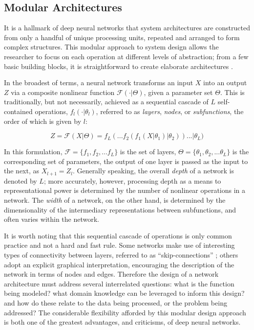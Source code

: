 \subsection{Modular Architectures}
\label{subsec:architectures}

It is a hallmark of deep neural networks that system architectures are constructed from only a handful of unique processing units, repeated and arranged to form complex structures.
This modular approach to system design allows the researcher to focus on each operation at different levels of abstraction;
from a few basic building blocks, it is straightforward to create elaborate architectures \cite{inceptionnet}.

In the broadest of terms, a neural network transforms an input $X$ into an output $Z$ via a composite nonlinear function $\mathcal{F}(\cdot \vert \Theta)$, given a parameter set $\Theta$.
This is traditionally, but not necessarily, achieved as a sequential cascade of $L$ self-contained operations, $f_l(\cdot \vert \theta_l)$, referred to as \emph{layers}, \emph{nodes}, or \emph{subfunctions}, the order of which is given by $l$:

\begin{equation}
\label{eq:layers}
Z = \mathcal{F}(X \vert \Theta) = f_{L}(  ... f_2(f_1(X \vert \theta_1) \vert \theta_2) ) ... \vert \theta_{L})
\end{equation}

\noindent In this formulation, $\mathcal{F} = \{f_1, f_2, ... f_{L} \}$ is the set of layers, $\Theta = \{\theta_1, \theta_2, ... \theta_{L} \}$ is the corresponding set of parameters, the output of one layer is passed as the input to the next, as $X_{l+1} = Z_{l}$.
Generally speaking, the overall \emph{depth} of a network is denoted by $L$;
more accurately, however, processing depth as a means to representational power is determined by the number of nonlinear operations in a network.
The \emph{width} of a network, on the other hand, is determined by the dimensionality of the intermediary representations between subfunctions, and often varies within the network.

It is worth noting that this sequential cascade of operations is only common practice and not a hard and fast rule.
Some networks make use of interesting types of connectivity between layers, referred to as ``skip-connections'' \cite{LeCun};
others adopt an explicit graphical interpretation, encouraging the description of the network in terms of nodes and edges.
Therefore the design of a network architecture must address several interrelated questions:
what is the function being modeled?
what domain knowledge can be leveraged to inform this design?
and how do these relate to the data being processed, or the problem being addressed?
The considerable flexibility afforded by this modular design approach is both one of the greatest advantages, and criticisms, of deep neural networks.


